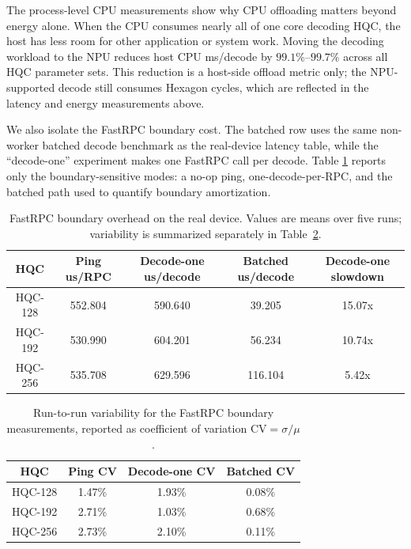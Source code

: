 The process-level CPU measurements show why CPU offloading matters beyond energy
alone. When the CPU consumes nearly all of one core decoding HQC, the host has
less room for other application or system work. Moving the decoding workload to
the NPU reduces host CPU ms/decode by \(99.1\%\)--\(99.7\%\) across all HQC
parameter sets. This reduction is a host-side offload metric only; the
NPU-supported decode still consumes Hexagon cycles, which are reflected in the
latency and energy measurements above.

We also isolate the FastRPC boundary cost. The batched row uses the same
non-worker batched decode benchmark as the real-device latency table, while the
``decode-one'' experiment makes one FastRPC call per decode. Table
\ref{tab:fastrpc-boundary-overhead} reports only the boundary-sensitive modes:
a no-op ping, one-decode-per-RPC, and the batched path used to
quantify boundary amortization.

\begin{table}[htbp]
\centering
\renewcommand{\arraystretch}{1.15}
\small

\begin{tabular}{|c|c|c|c|c|}
\hline
\textbf{HQC} & \textbf{Ping us/RPC} & \textbf{Decode-one us/decode} &
\textbf{Batched us/decode} & \textbf{Decode-one slowdown} \\
\hline
HQC-128 & 552.804 & 590.640 & 39.205 & 15.07x \\
\hline
HQC-192 & 530.990 & 604.201 & 56.234 & 10.74x \\
\hline
HQC-256 & 535.708 & 629.596 & 116.104 & 5.42x \\
\hline
\end{tabular}
\vspace{0.5em}
\caption{FastRPC boundary overhead on the real device. Values are means over five runs; variability is summarized separately in Table~\ref{tab:fastrpc-boundary-stability}.}
\label{tab:fastrpc-boundary-overhead}
\end{table}

\begin{table}[htbp]
\centering
\renewcommand{\arraystretch}{1.15}
\small
\begin{tabular}{|c|c|c|c|}
\hline
\textbf{HQC} & \textbf{Ping CV} & \textbf{Decode-one CV} &
\textbf{Batched CV} \\
\hline
HQC-128 & 1.47\% & 1.93\% & 0.08\% \\
\hline
HQC-192 & 2.71\% & 1.03\% & 0.68\% \\
\hline
HQC-256 & 2.73\% & 2.10\% & 0.11\% \\
\hline
\end{tabular}
\vspace{0.5em}
\caption{Run-to-run variability for the FastRPC boundary measurements, reported as coefficient of variation \(\mathrm{CV}=\sigma/\mu\).}
\label{tab:fastrpc-boundary-stability}
\end{table}

